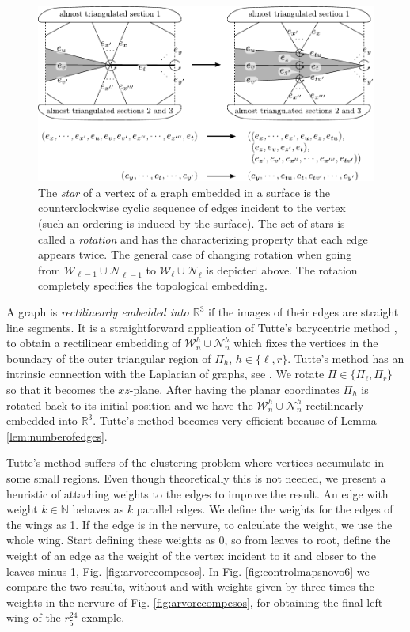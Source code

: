 \begin{figure}[!htb] 
\begin{center}
\includegraphics[width=15 cm]{A.figs/controlmaps01novo2.pdf}
\caption{The {\em star}  of a vertex of a graph embedded in a surface is the counterclockwise cyclic sequence of 
edges incident to the vertex (such an ordering is induced by the surface).
The set of stars is called a { \em rotation}  and has the 
characterizing property that each edge appears twice.
The general case of changing rotation when going from 
$\mathcal{W}_{\ell-1} \cup \mathcal{N}_{\ell-1}$ to
$\mathcal{W}_{\ell} \cup \mathcal{N}_{\ell}$ is depicted above. 
The rotation completely specifies the topological embedding.}
\label{fig:controlmaps01novo2}
\end{center}
\end{figure}

A graph is {\em rectilinearly embedded into $\mathbb{R}^3$} if 
the images of their edges are straight
line segments.
It is a straightforward application of Tutte's barycentric method \cite{tutte1963dg},
\cite{colin2003tutte} to obtain a rectilinear embedding of
$\mathcal{W}_n^h \cup \mathcal{N}_n^h$ which fixes the vertices in the boundary of the 
outer triangular region of $\Pi_h$, $h \in \{\ell,r\}$.
Tutte's method has an intrinsic connection with the Laplacian of graphs, see  \cite{Klarreich0412}.
We rotate $\Pi \in \{ \Pi_\ell, \Pi_r \}$
so that it becomes the $xz$-plane. After having the planar coordinates
$\Pi_h$ is rotated back to its initial position and we have the 
$\mathcal{W}_n^h \cup \mathcal{N}_n^h$ rectilinearly embedded into $\mathbb{R}^3$.
Tutte's method becomes very efficient because of Lemma \ref{lem:numberofedges}.


Tutte's method suffers of the clustering problem where vertices accumulate
in some small regions. Even though theoretically this is not 
needed, we present a heuristic of attaching weights to the edges
to improve the result. An edge with weight $k\in\mathbb{N}$ behaves
as $k$ parallel edges.
We define the weights for the edges of the wings as 1.
If the edge is in the nervure,
to calculate the weight, we use the whole wing. 
Start defining these weights as 0, so from leaves to root, 
define the weight of an edge
as the weight of the vertex incident to it and closer to 
the leaves minus 1, Fig. \ref{fig:arvorecompesos}.
In Fig. \ref{fig:controlmapsnovo6} we compare the two results,
without and with weights given by three times the weights in the nervure 
of Fig. \ref{fig:arvorecompesos}, 
for obtaining the final left wing of the $r^{24}_5$-example.


